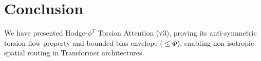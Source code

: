 \section{Conclusion}
We have presented Hodge-$\phi^T$ Torsion Attention (v3), proving its anti-symmetric torsion flow property and bounded bias envelope ($\le \Phi$), enabling non-isotropic spatial routing in Transformer architectures.